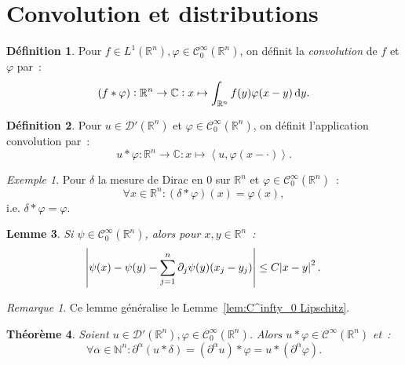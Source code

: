 \documentclass{report}
\newcommand{\C}{{\mathbb C}}
\newcommand{\R}{{\mathbb R}}
\newcommand{\N}{{\mathbb N}}
\newcommand{\scpr}[2]{\left\langle#1, #2\right\rangle}
\newtheorem{thm}{Théorème}[chapter]
\newtheorem{lem}[thm]{Lemme}
\theoremstyle{definition}
\newtheorem{déf}[thm]{Définition}
\theoremstyle{remark}
\newtheorem*{rmq}{Remarque}
\newtheorem{ex}{Exemple}[chapter]
\begin{document}
\section{Convolution et distributions}

\begin{déf} Pour $f \in L^1(\R^n), \varphi \in \mathcal C^\infty_0(\R^n)$, on définit la \textit{convolution} de $f$ et $\varphi$ par~:
\[(f * \varphi) : \R^n \to \C : x \mapsto \int_{\R^n}f(y)\varphi(x-y)\dif y.\]
\end{déf}

\begin{déf} Pour $u \in \mathcal D'(\R^n)$ et $\varphi \in \mathcal C^\infty_0(\R^n)$, on définit l'application convolution par~:
\[u*\varphi : \R^n \to \C : x \mapsto \scpr u{\varphi(x-\cdot)}.\]
\end{déf}

\begin{ex} Pour $\delta$ la mesure de Dirac en 0 sur $\R^n$ et $\varphi \in \mathcal C^\infty_0(\R^n)$~:
\[\forall x \in \R^n : (\delta * \varphi)(x) = \varphi(x),\]
i.e. $\delta * \varphi = \varphi$.
\end{ex}

\begin{lem}\label{lem:C^infty_0 Lipschitz^2} Si $\psi \in \mathcal C^\infty_0(\R^n)$, alors pour $x, y \in \R^n$~:
\[\abs {\psi(x) - \psi(y) - \sum_{j=1}^n\partial_j\psi(y)(x_j-y_j)} \leq C\abs {x-y}^2.\]
\end{lem}

\begin{rmq} Ce lemme généralise le Lemme~\ref{lem:C^infty_0 Lipschitz}.
\end{rmq}

\begin{thm} Soient $u \in \mathcal D'(\R^n), \varphi \in \mathcal C^\infty_0(\R^n)$. Alors $u * \varphi \in \mathcal C^\infty(\R^n)$ et~:
\[\forall \alpha \in \N^n : \partial^\alpha(u * \delta) = (\partial^\alpha u) * \varphi = u * (\partial^\alpha\varphi).\]
\end{thm}
\end{document}
